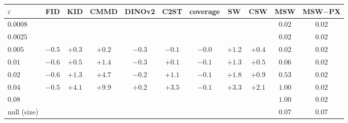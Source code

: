 \begin{tabular}{lcccccccccc}
\toprule
$\varepsilon$ & FID & KID & CMMD & DINOv2 & C2ST & coverage & SW & CSW & MSW & MSW$-$PX \\
\midrule
$0.0008$ &  &  &  &  &  &  &  &  & $0.02$ & $0.02$ \\
$0.0025$ &  &  &  &  &  &  &  &  & $0.02$ & $0.02$ \\
$0.005$ & $-0.5$ & $+0.3$ & $+0.2$ & $-0.3$ & $-0.1$ & $-0.0$ & $+1.2$ & $+0.4$ & $0.02$ & $0.02$ \\
$0.01$ & $-0.6$ & $+0.5$ & $+1.4$ & $-0.3$ & $+0.1$ & $-0.1$ & $+1.3$ & $+0.5$ & $0.06$ & $0.02$ \\
$0.02$ & $-0.6$ & $+1.3$ & $\mathbf{+4.7}$ & $-0.2$ & $+1.1$ & $-0.1$ & $+1.8$ & $+0.9$ & $0.53$ & $0.02$ \\
$0.04$ & $-0.5$ & $\mathbf{+4.1}$ & $\mathbf{+9.9}$ & $+0.2$ & $\mathbf{+3.5}$ & $-0.1$ & $\mathbf{+3.3}$ & $+2.1$ & $\mathbf{1.00}$ & $0.02$ \\
$0.08$ &  &  &  &  &  &  &  &  & $\mathbf{1.00}$ & $0.02$ \\
\midrule
null (size) &  &  &  &  &  &  &  &  & $0.07$ & $0.07$ \\
\bottomrule
\end{tabular}
